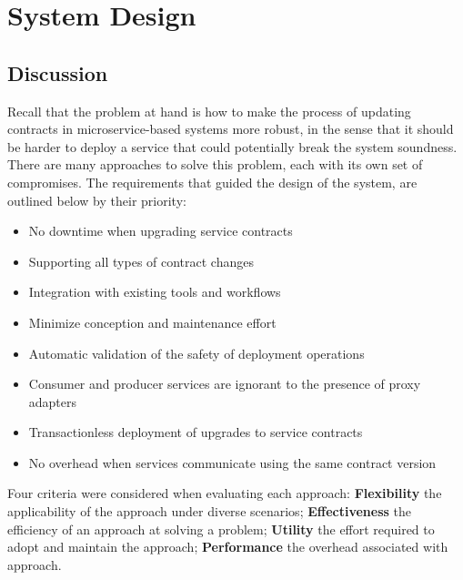 
%

\chapter{System Design}
\label{cha:design}

\section{Discussion} %
\label{sec:discussion}

Recall that the problem at hand is how to make the process of updating contracts in
microservice-based systems more robust, in the sense that it should be harder to deploy a service that could
potentially break the system soundness.
There are many approaches to solve this problem, each with its own set of compromises.
The requirements that guided the design of the system, are outlined below by their priority:

\begin{itemize}
    \item No downtime when upgrading service contracts
    \item Supporting all types of contract changes
    \item Integration with existing tools and workflows
    \item Minimize conception and maintenance effort
    \item Automatic validation of the safety of deployment operations
    \item Consumer and producer services are ignorant to the presence of proxy adapters
    \item Transactionless deployment of upgrades to service contracts
    \item No overhead when services communicate using the same contract version
\end{itemize}

Four criteria were considered when evaluating each approach:
\textbf{Flexibility} the applicability of the approach under diverse scenarios;
\textbf{Effectiveness} the efficiency of an approach at solving a problem;
\textbf{Utility} the effort required to adopt and maintain the approach;
\textbf{Performance} the overhead associated with approach.


